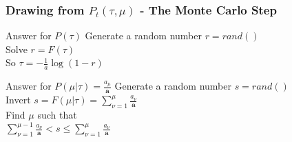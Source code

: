 \documentclass{beamer}
\begin{document}
\begin{frame}
\frametitle{Drawing from $P_t(\tau,\mu)$ - The Monte Carlo Step}
 \begin{block}{Answer for $P(\tau)$}
   Generate a random number $r=rand()$ \\
 Solve $r=F(\tau)$\\
 So $\tau=-\frac{1}{a}\log (1-r)$
 \end{block}

\begin{block}{Answer for $P(\mu|\tau)=\frac{a_\mu}{\boldsymbol a}$}
Generate a random number $s=rand()$\\
Invert $s=F(\mu|\tau)=\sum_{\nu=1}^\mu\frac{a_\nu}{\boldsymbol a}$\\
Find $\mu$ such that \\
$\sum_{\nu=1}^{\mu-1}\frac{a_\nu}{\boldsymbol a} < s \leq \sum_{\nu=1}^{\mu}\frac{a_\nu}{\boldsymbol a} $
\end{block}


\end{frame}
\end{document}
